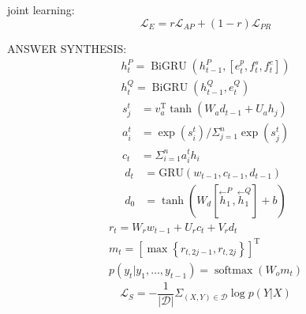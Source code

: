 \documentclass[a4paper,UTF8]{article}
\numberwithin{equation}{section}
\begin{document}
joint learning:
\begin{equation}
	\mathcal{L}_{E}=r \mathcal{L}_{A P}+(1-r) \mathcal{L}_{P R}
	\end{equation}

ANSWER SYNTHESIS:
\begin{equation}
\begin{array}{l}{h_{t}^{P}=\operatorname{BiGRU}\left(h_{t-1}^{P},\left[e_{t}^{p}, f_{t}^{s}, f_{t}^{e}\right]\right)} \\ {h_{t}^{Q}=\operatorname{BiGRU}\left(h_{t-1}^{Q}, e_{t}^{Q}\right)}\end{array}
\end{equation}
\begin{equation}
\begin{aligned} s_{j}^{t} &=v_{a}^{\mathrm{T}} \tanh \left(W_{a} d_{t-1}+U_{a} h_{j}\right) \\ a_{i}^{t} &=\exp \left(s_{i}^{t}\right) / \Sigma_{j=1}^{n} \exp \left(s_{j}^{t}\right) \\ c_{t} &=\Sigma_{i=1}^{n} a_{i}^{t} h_{i} \end{aligned}
\end{equation}
\begin{equation}
\begin{aligned} d_{t} &=\mathrm{GRU}\left(w_{t-1}, c_{t-1}, d_{t-1}\right) \\ d_{0} &=\tanh \left(W_{d}\left[\overset{\leftarrow}{h}_{1}^{P}, \overset{\leftarrow}{h}_{1}^{Q}\right]+b\right) \end{aligned}
\end{equation}
\begin{equation}
\begin{array}{c}{r_{t}=W_{r} w_{t-1}+U_{r} c_{t}+V_{r} d_{t}} \\ {m_{t}=\left[\max \left\{r_{t, 2 j-1}, r_{t, 2 j}\right\}\right]^{\mathrm{T}}} \\ {p\left(y_{t} | y_{1}, \ldots, y_{t-1}\right)=\operatorname{softmax}\left(W_{o} m_{t}\right)}\end{array}
\end{equation}
\begin{equation}
	\mathcal{L}_{S}=-\frac{1}{|\mathcal{D}|} \Sigma_{(X, Y) \in \mathcal{D}} \log p(Y | X)
	\end{equation}
\newpage
\end{document}
